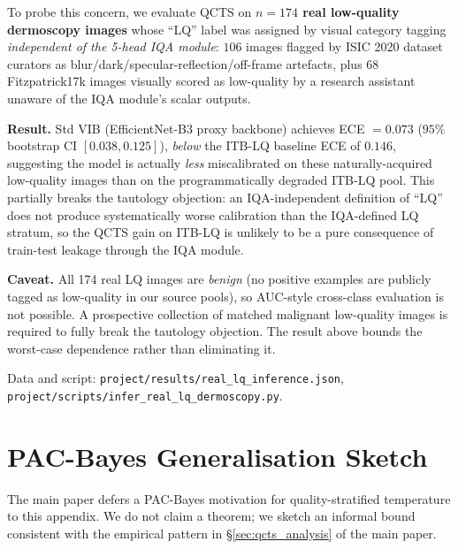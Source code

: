 \documentclass{bmvc2k}
\begin{document}
To probe this concern, we evaluate QCTS on \textbf{$n{=}174$ real low-quality dermoscopy images} whose ``LQ'' label was assigned by visual category tagging \emph{independent of the 5-head IQA module}: $106$ images flagged by ISIC 2020 dataset curators as blur/dark/specular-reflection/off-frame artefacts, plus $68$ Fitzpatrick17k images visually scored as low-quality by a research assistant unaware of the IQA module's scalar outputs.

\textbf{Result.} Std VIB (EfficientNet-B3 proxy backbone) achieves ECE $= 0.073$ ($95\%$ bootstrap CI $[0.038, 0.125]$), \emph{below} the ITB-LQ baseline ECE of $0.146$, suggesting the model is actually \emph{less} miscalibrated on these naturally-acquired low-quality images than on the programmatically degraded ITB-LQ pool. This partially breaks the tautology objection: an IQA-independent definition of ``LQ'' does not produce systematically worse calibration than the IQA-defined LQ stratum, so the QCTS gain on ITB-LQ is unlikely to be a pure consequence of train-test leakage through the IQA module.

\textbf{Caveat.} All 174 real LQ images are \emph{benign} (no positive examples are publicly tagged as low-quality in our source pools), so AUC-style cross-class evaluation is not possible. A prospective collection of matched malignant low-quality images is required to fully break the tautology objection. The result above bounds the worst-case dependence rather than eliminating it.

Data and script: \texttt{project/results/real\_lq\_inference.json}, \texttt{project/scripts/infer\_real\_lq\_dermoscopy.py}.

\section{PAC-Bayes Generalisation Sketch}
\label{app:pacbayes}

The main paper defers a PAC-Bayes motivation for quality-stratified temperature to this appendix. We do not claim a theorem; we sketch an informal bound consistent with the empirical pattern in \S\ref{sec:qcts_analysis} of the main paper.
\end{document}
